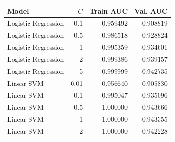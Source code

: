 \par\noindent
\begin{tabularx}{\linewidth}{@{}Yrrr@{}}
\toprule
Model & $C$ & Train AUC & Val. AUC \\
\midrule
Logistic Regression & 0.1 & 0.959492 & 0.908819 \\
Logistic Regression & 0.5 & 0.986518 & 0.928824 \\
Logistic Regression & 1 & 0.995359 & 0.934601 \\
Logistic Regression & 2 & 0.999386 & 0.939157 \\
Logistic Regression & 5 & 0.999999 & 0.942735 \\
Linear SVM & 0.01 & 0.956640 & 0.905830 \\
Linear SVM & 0.1 & 0.995047 & 0.935096 \\
Linear SVM & 0.5 & 1.000000 & 0.943666 \\
Linear SVM & 1 & 1.000000 & 0.943355 \\
Linear SVM & 2 & 1.000000 & 0.942228 \\
\bottomrule
\end{tabularx}
\par
